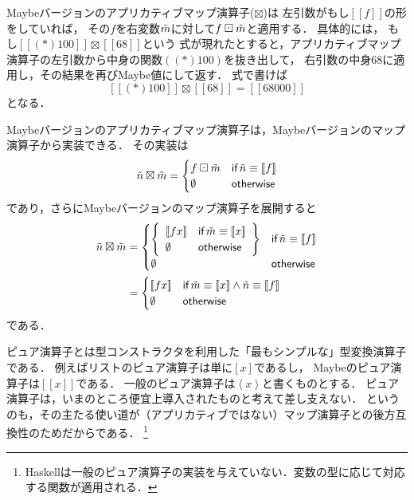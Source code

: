 \documentclass[a4paper,draft]{jsbook}
\def\[{\left[\!\left[}
\def\]{\right]\!\right]}
\newcommand{\programminglanguage}[1]{\textsf{#1}}
\newcommand{\haskell}{\programminglanguage{Haskell}}
\newcommand{\mathMaybeVar}[1]{\Tilde{#1}}
\newcommand{\mathMaybeWith}[1]{\[#1\]}
\newcommand{\mathPureWith}[1]{\left\langle#1\right\rangle}
\newcommand{\mathNothing}{\emptyset}
\newcommand{\mathApplicativeMaybeMap}{\mathbin{\boxtimes}}
\newcommand{\mathMaybeMap}{\mathbin{\boxdot}}
\newcommand{\mathKeyword}[1]{\operatorname{\textsf{#1}}}
\newcommand{\mathIf}{\mathKeyword{if}}
\newcommand{\mathOtherwise}{\mathKeyword{otherwise}}
\begin{document}
Maybeバージョンのアプリカティブマップ演算子($\mathApplicativeMaybeMap$)は
左引数がもし$\mathMaybeWith{f}$の形をしていれば，
その$f$を右変数$\mathMaybeVar{m}$に対して$f\mathMaybeMap\mathMaybeVar{m}$と適用する．
具体的には，
もし$\mathMaybeWith{(*)100}\mathApplicativeMaybeMap{}\mathMaybeWith{68}$という
式が現れたとすると，アプリカティブマップ演算子の左引数から中身の関数$((*)100)$を抜き出して，
右引数の中身$68$に適用し，その結果を再びMaybe値にして返す．
式で書けば
$$
\mathMaybeWith{(*)100}\mathApplicativeMaybeMap{}\mathMaybeWith{68}=\mathMaybeWith{68000}
$$
となる．

Maybeバージョンのアプリカティブマップ演算子は，Maybeバージョンのマップ演算子から実装できる．
その実装は
\begin{equation}
\mathMaybeVar{n}\mathApplicativeMaybeMap\mathMaybeVar{m}=\begin{cases}
f\mathMaybeMap\mathMaybeVar{m}&\mathIf\mathMaybeVar{n}\equiv\mathMaybeWith{f}\\
\mathNothing&\mathOtherwise
\end{cases}
\end{equation}
であり，さらにMaybeバージョンのマップ演算子を展開すると
\begin{align*}
\mathMaybeVar{n}\mathApplicativeMaybeMap\mathMaybeVar{m}&=\begin{cases}
\left\{
\begin{array}{ll}
\mathMaybeWith{fx}&\mathIf\mathMaybeVar{m}\equiv\mathMaybeWith{x}\\
\mathNothing&\mathOtherwise
\end{array}\right\}&\mathIf\mathMaybeVar{n}\equiv\mathMaybeWith{f}\\
\mathNothing&\mathOtherwise
\end{cases}\\
&=\begin{cases}
\mathMaybeWith{fx}&\mathIf\mathMaybeVar{m}\equiv\mathMaybeWith{x}\wedge\mathMaybeVar{n}\equiv\mathMaybeWith{f}\\
\mathNothing&\mathOtherwise
\end{cases}
\end{align*}
である．

ピュア演算子とは型コンストラクタを利用した「最もシンプルな」型変換演算子である．
例えばリストのピュア演算子は単に$[x]$であるし，
Maybeのピュア演算子は$\mathMaybeWith{x}$である．
一般のピュア演算子は$\mathPureWith{x}$と書くものとする．
ピュア演算子は，いまのところ便宜上導入されたものと考えて差し支えない．
というのも，その主たる使い道が（アプリカティブではない）マップ演算子との後方互換性のためだからである．%
\footnote{\haskell は一般のピュア演算子の実装を与えていない．変数の型に応じて対応する関数が適用される．}
\end{document}
